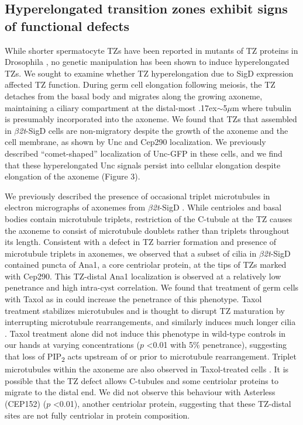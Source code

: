 \documentclass[12pt, twoside, letterpaper]{article}
\newcommand{\PIP}{PIP\textsubscript{2}}
\newcommand{\sigd}{$\beta$\textit{2t}-SigD}
\begin{document}
\subsection{Hyperelongated transition zones exhibit signs of functional defects}
While shorter spermatocyte TZs have been reported in mutants of TZ proteins in Drosophila
\citep{vieillard2016transition, pratt2016drosophila},
no genetic manipulation has been shown to induce hyperelongated TZs.
We sought to examine whether TZ hyperelongation due to SigD expression
affected TZ function.
During germ cell elongation following meiosis, the TZ detaches from
the basal body and migrates along the growing axoneme, maintaining a ciliary compartment
at the distal-most {\raise.17ex\hbox{$\scriptstyle\sim$}}5$\mu$m where tubulin
is presumably incorporated into the axoneme.
We found that
TZs that assembled in \sigd{} cells are non-migratory despite the growth of the
axoneme and the cell membrane, as shown by Unc and Cep290 localization.
We previously described ``comet-shaped'' localization of Unc-GFP in these cells,
and we find that these hyperelongated Unc signals persist into cellular elongation
despite elongation of the axoneme (Figure 3).

We previously described the presence of occasional triplet microtubules
in electron micrographs of axonemes from \sigd{} \citep{wei2008depletion}.
While centrioles and basal bodies contain microtubule triplets,
restriction of the C-tubule at the TZ causes the axoneme to
consist of microtubule doublets rather than triplets throughout its length.
Consistent with a defect in TZ barrier formation and presence of
microtubule triplets in axonemes,
we observed that a subset of cilia in \sigd{}
contained puncta of Ana1, a core centriolar protein, at the tips
of TZs marked with Cep290.
This TZ-distal Ana1 localization is observed at a relatively low penetrance
and high intra-cyst correlation.
We found that treatment of germ cells with Taxol as in \citep{riparbelli2013unique}
could increase the penetrance of this phenotype.
Taxol treatment stabilizes microtubules and is thought to disrupt TZ maturation
by interrupting microtubule rearrangements, and similarly induces much longer cilia
\citep{riparbelli2012assembly}.
Taxol treatment alone did not induce this phenotype in wild-type controls in our hands
at varying concentrations ($p$ <0.01 with 5\% penetrance),
suggesting that loss of \PIP{} acts upstream of or prior to microtubule rearrangement.
Triplet microtubules within the axoneme are also observed in Taxol-treated cells \citep{riparbelli2013unique}.
It is possible that the TZ defect allows C-tubules and some centriolar proteins
to migrate to the distal end.
We did not observe this behaviour with Asterless (CEP152)
\citep{dzhindzhev2010asterless, blachon2008drosophila} ($p$ <0.01),
another centriolar protein, suggesting that these TZ-distal
sites are not fully centriolar in protein composition.
\end{document}
